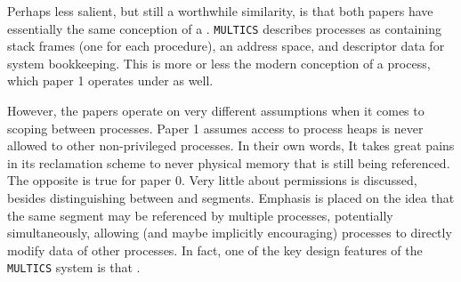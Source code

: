 \documentclass{article}
\begin{document}
Perhaps less salient, but still a worthwhile similarity, is that both papers have essentially the same conception of a . \verb|MULTICS| describes processes as containing stack frames (one for each procedure), an address space, and descriptor data for system bookkeeping. This is more or less the modern conception of a process, which paper 1 operates under as well.

However, the papers operate on very different assumptions when it comes to scoping between processes. Paper 1 assumes access to process heaps is never allowed to other non-privileged processes. In their own words,  It takes great pains in its reclamation scheme to never  physical memory that is still being referenced. The opposite is true for paper 0. Very little about permissions is discussed, besides distinguishing between  and  segments. Emphasis is placed on the idea that the same segment may be referenced by multiple processes, potentially simultaneously, allowing (and maybe implicitly encouraging) processes to directly modify data of other processes. In fact, one of the key design features of the \verb|MULTICS| system is that .
\end{document}
